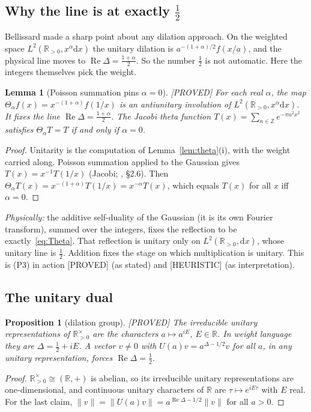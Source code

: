 \documentclass[11pt,a4paper]{article}
\theoremstyle{plain}
\newtheorem{proposition}[theorem]{Proposition}
\newtheorem{lemma}[theorem]{Lemma}
\theoremstyle{definition}
\theoremstyle{remark}
\newcommand{\R}{\mathbb{R}}
\newcommand{\Z}{\mathbb{Z}}
\newcommand{\dd}{\mathrm{d}}
\newcommand{\Rp}{\R_{>0}}
\newcommand{\lab}[1]{\textsf{\small[#1]}}
\newcommand{\PROVED}{\lab{PROVED}}
\newcommand{\HEUR}{\lab{HEURISTIC}}
\renewcommand{\Re}{\operatorname{Re}}
\begin{document}
\subsection{Why the line is at exactly $\tfrac12$}

Bellissard \cite{Bellissard2017} made a sharp point about any dilation
approach. On the weighted space $L^2(\Rp,x^\alpha\dd x)$ the unitary dilation
is $a^{-(1+\alpha)/2}f(x/a)$, and the physical line moves to
$\Re\Delta=\tfrac{1+\alpha}2$. So the number $\tfrac12$ is not automatic. Here
the integers themselves pick the weight.

\begin{lemma}[Poisson summation pins $\alpha=0$]\label{lem:alpha}
\PROVED{} For each real $\alpha$, the map
$\Theta_\alpha f(x)=x^{-(1+\alpha)}\overline{f(1/x)}$ is an antiunitary
involution of $L^2(\Rp,x^\alpha\dd x)$. It fixes the line
$\Re\Delta=\tfrac{1+\alpha}2$. The Jacobi theta function
$T(x)=\sum_{n\in\Z}e^{-\pi n^2x^2}$ satisfies $\Theta_\alpha T=T$ if and only
if $\alpha=0$.
\end{lemma}
\begin{proof}
Unitarity is the computation of Lemma~\ref{lem:theta}(i), with the weight
carried along. Poisson summation applied to the Gaussian gives
$T(x)=x^{-1}T(1/x)$ (Jacobi; \cite{Titchmarsh1986}, \S2.6). Then
$\Theta_\alpha T(x)=x^{-(1+\alpha)}T(1/x)=x^{-\alpha}T(x)$, which equals
$T(x)$ for all $x$ iff $\alpha=0$.
\end{proof}
\noindent
\emph{Physically:} the additive self-duality of the Gaussian (it is its own
Fourier transform), summed over the integers, fixes the reflection to be
exactly~\eqref{eq:Theta}. That reflection is unitary only on $L^2(\Rp,\dd x)$,
whose unitary line is $\tfrac12$. Addition fixes the stage on which
multiplication is unitary. This is (P3) in action \PROVED{} (as stated) and
\HEUR{} (as interpretation).

\subsection{The unitary dual}

\begin{proposition}[dilation group]\label{prop:dil}
\PROVED{} The irreducible unitary representations of $\Rp^\times$ are the
characters $a\mapsto a^{iE}$, $E\in\R$. In weight language they are
$\Delta=\tfrac12+iE$. A vector $v\neq0$ with $U(a)v=a^{\Delta-1/2}v$ for all
$a$, in any unitary representation, forces $\Re\Delta=\tfrac12$.
\end{proposition}
\begin{proof}
$\Rp^\times\cong(\R,+)$ is abelian, so its irreducible unitary
representations are one-dimensional, and continuous unitary characters of
$\R$ are $\tau\mapsto e^{iE\tau}$ with $E$ real. For the last claim,
$\|v\|=\|U(a)v\|=a^{\Re\Delta-1/2}\|v\|$ for all $a>0$.
\end{proof}
\end{document}
